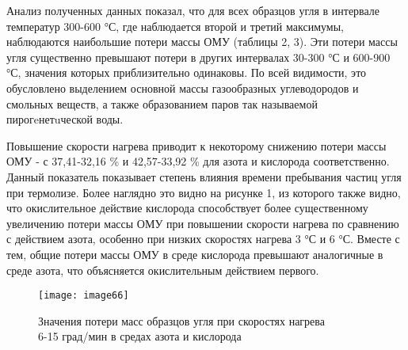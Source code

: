 \begin{multicols}{2}
Анализ полученных данных показал, что для всех образцов угля в интервале
температур 300-600 °С, где наблюдается второй и третий максимумы,
наблюдаются наибольшие потери массы ОМУ (таблицы 2, 3). Эти потери массы
угля существенно превышают потери в других интервалах 30-300 °С и
600-900 °С, значения которых приблизительно одинаковы. По всей
видимости, это обусловлено выделением основной массы газообразных
углеводородов и смольных веществ, а также образованием паров так
называемой пирогeнетuческой воды.

Повышение скорости нагрева приводит к некоторому снижению потери массы
ОМУ - с 37,41-32,16 \% и 42,57-33,92 \% для азота и кислорода
соответственно. Данный показатель показывает степень влияния времени
пребывания частиц угля при термолизе. Более наглядно это видно на
рисунке 1, из которого также видно, что окислительное действие кислорода
способствует более существенному увеличению потери массы ОМУ при
повышении скорости нагрева по сравнению с действием азота, особенно при
низких скоростях нагрева 3 °С и 6 °С. Вместе с тем, общие потери массы
ОМУ в среде кислорода превышают аналогичные в среде азота, что
объясняется окислительным действием первого.
\end{multicols}

\begin{figure}[H]
\centering
\texttt{[image: image66]}
\caption{Значения потери масс образцов угля при скоростях нагрева\\
6-15 град/мин в средах азота и кислорода}
\end{figure}

